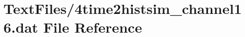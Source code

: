 \hypertarget{4time2histsim__channel16_8dat}{}\section{Text\+Files/4time2histsim\+\_\+channel16.dat File Reference}
\label{4time2histsim__channel16_8dat}
